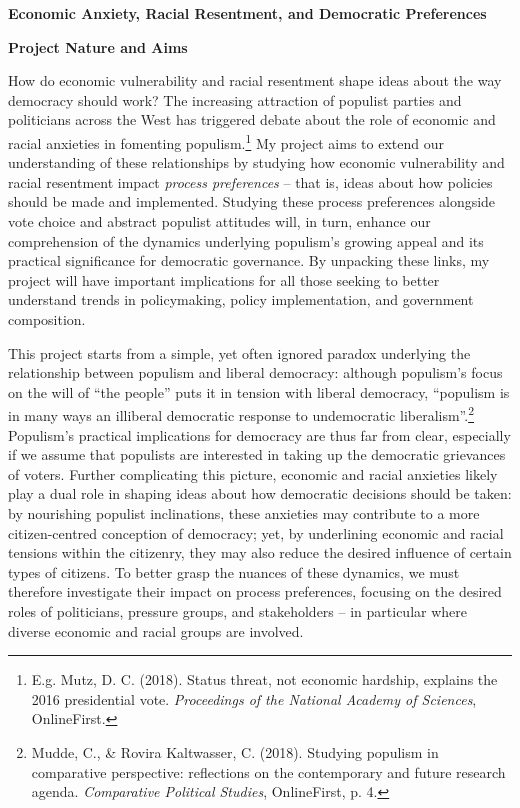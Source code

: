 \documentclass[fontsize=10.5pt,letterpaper]{scrartcl}
\begin{document}
  \raggedbottom

{\large \textbf{Economic Anxiety, Racial Resentment, and Democratic Preferences}}

\textbf{Project Nature and Aims}
\vspace{-.9em}

How do economic vulnerability and racial resentment shape ideas about the way democracy should work? The increasing attraction of populist parties and politicians across the West has triggered debate about the role of economic and racial anxieties in fomenting populism.\footnote{E.g. Mutz, D. C. (2018). Status threat, not economic hardship, explains the 2016 presidential vote. \textit{Proceedings of the National Academy of Sciences}, OnlineFirst.} My project aims to extend our understanding of these relationships by studying how economic vulnerability and racial resentment impact \textit{process preferences} – that is, ideas about how policies should be made and implemented. Studying these process preferences alongside vote choice and abstract populist attitudes will, in turn, enhance our comprehension of the dynamics underlying populism’s growing appeal and its practical significance for democratic governance. By unpacking these links, my project will have important implications for all those seeking to better understand trends in policymaking, policy implementation, and government composition.

This project starts from a simple, yet often ignored paradox underlying the relationship between populism and liberal democracy: although populism’s focus on the will of “the people” puts it in tension with liberal democracy, “populism is in many ways an illiberal democratic response to undemocratic liberalism”.\footnote{Mudde, C., \& Rovira Kaltwasser, C. (2018). Studying populism in comparative perspective: reflections on the contemporary and future research agenda. \textit{Comparative Political Studies}, OnlineFirst, p. 4.} Populism’s practical implications for democracy are thus far from clear, especially if we assume that populists are interested in taking up the democratic grievances of voters. Further complicating this picture, economic and racial anxieties likely play a dual role in shaping ideas about how democratic decisions should be taken: by nourishing populist inclinations, these anxieties may contribute to a more citizen-centred conception of democracy; yet, by underlining economic and racial tensions within the citizenry, they may also reduce the desired influence of certain types of citizens. To better grasp the nuances of these dynamics, we must therefore investigate their impact on process preferences, focusing on the desired roles of politicians, pressure groups, and stakeholders – in particular where diverse economic and racial groups are involved.
\end{document}
